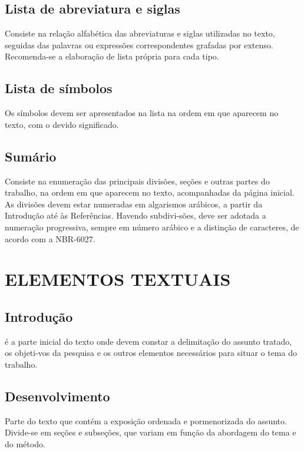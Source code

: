 \subsection{Lista de abreviatura e siglas}

Consiste na rela\c{c}ão alfab\'{e}tica das abreviaturas e siglas
utilizadas no texto, seguidas das palavras ou expressões correspondentes grafadas por extenso. Recomenda-se a elabora\c{c}ão de lista pr\'{o}pria para cada tipo.

\subsection{Lista de símbolos}

Os símbolos devem ser apresentados na lista na ordem em que
aparecem no texto, com o devido significado.

\subsection{Sumário}

Consiste na enumera\c{c}ão das principais divisões, se\c{c}ões e outras
partes do trabalho, na ordem em que aparecem no texto, acompanhadas da página inicial. As divisões devem estar numeradas em algarismos arábicos, a partir da Introdu\c{c}ão at\'{e} \`{a}s Refer\^{e}ncias. Havendo subdivi-sões, deve ser adotada a numera\c{c}ão progressiva, sempre em número arábico e a distin\c{c}ão de caracteres, de acordo com a NBR-6027.

\section{ELEMENTOS TEXTUAIS}

\subsection{Introdu\c{c}ão}

\'{e} a parte inicial do texto onde devem constar a delimita\c{c}ão do
assunto tratado, os objeti-vos da pesquisa e os outros elementos necessários para situar o tema do trabalho.

\subsection{Desenvolvimento}

Parte do texto que cont\'{e}m a exposi\c{c}ão ordenada e pormenorizada do
assunto. Divide-se em se\c{c}ões e subse\c{c}ões, que variam em fun\c{c}ão da abordagem do tema e do m\'{e}todo.

